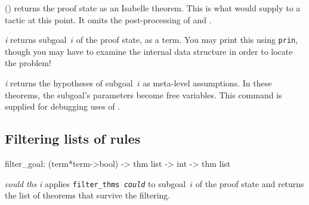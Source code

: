 \begin{ttdescription}
\item[\ttindexbold{topthm}()]  
returns the proof state as an Isabelle theorem.  This is what 
would supply to a tactic at this point.  It omits the post-processing of
 and .

\item[\ttindexbold{getgoal} {\it i}]  
returns subgoal~$i$ of the proof state, as a term.  You may print
this using \texttt{prin}, though you may have to examine the internal
data structure in order to locate the problem!

\item[\ttindexbold{gethyps} {\it i}]
  returns the hypotheses of subgoal~$i$ as meta-level assumptions.  In
  these theorems, the subgoal's parameters become free variables.  This
  command is supplied for debugging uses of .
\end{ttdescription}


\subsection{Filtering lists of rules}
\begin{ttbox} 
filter_goal: (term*term->bool) -> thm list -> int -> thm list
\end{ttbox}

\begin{ttdescription}
\item[\ttindexbold{filter_goal} {\it could} {\it ths} {\it i}] 
applies \texttt{filter_thms {\it could}} to subgoal~$i$ of the proof
state and returns the list of theorems that survive the filtering. 
\end{ttdescription}



